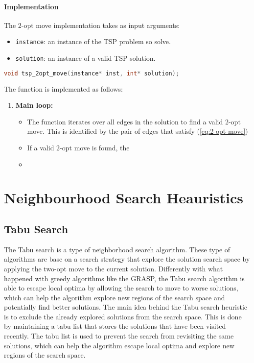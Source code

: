 \documentclass{article}
\begin{document}
\paragraph{Implementation}
The 2-opt move implementation takes as input arguments:
\begin{itemize}
	\item \texttt{instance}: an instance of the TSP problem so solve.
	\item \texttt{solution}: an instance of a valid TSP solution.
\end{itemize}
\begin{lstlisting}[language=C]
	void tsp_2opt_move(instance* inst, int* solution);
\end{lstlisting}
The function is implemented as follows:
\begin{enumerate}
	\item \textbf{Main loop:} 
	\begin{itemize}
	\item The function iterates over all edges in the solution to find a valid 2-opt move. This is identified by the pair of edges that satisfy (\ref{eq:2-opt-move})
	\item If a valid 2-opt move is found, the 
	\item 
	\end{itemize}
\end{enumerate}
\newpage
\section{Neighbourhood Search Heauristics}

\subsection{Tabu Search}
The Tabu search is a type of neighborhood search algorithm. These type of algorithms are base on a search strategy that explore the solution search space by applying 
the two-opt move to the current solution. 
Differently with what happened with greedy algorithms like the GRASP, the Tabu search algorithm is able to escape local optima by allowing the search to move to worse solutions,
which can help the algorithm explore new regions of the search space and potentially find better solutions.
The main idea behind the Tabu search heuristic is to exclude the already explored solutions from the search space. 
This is done by maintaining a tabu list that stores the solutions that have been visited recently. 
The tabu list is used to prevent the search from revisiting the same solutions, 
which can help the algorithm escape local optima and explore new regions of the search space\cite{Heuristics_for_the_Traveling_Salesman_Problem}.
\end{document}
